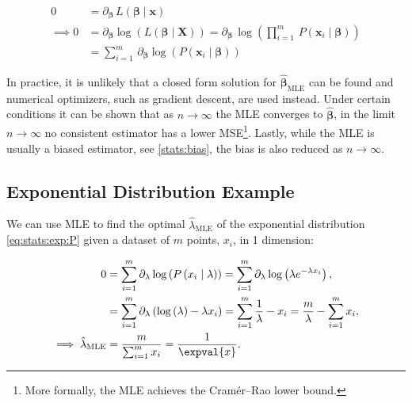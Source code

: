 \begin{subequations}\label{eq:MLE}
\begin{align}
0 &= \partial_{\bm{\beta}} \, L\left(\bm{\beta} \mid \mathbf{x}\right) \label{eq:MLE:L} \\
\implies 0 &= \partial_{\bm{\beta}} \log\left(L\left(\bm{\beta} \mid \mathbf{X}\right)\right) = \partial_{\bm{\beta}} \, \log\left(\prod_{i=1}^{m} \, P\left(\mathbf{x}_{i} \mid \bm{\beta}\right)\right) \label{eq:MLE:log_L} \\
&= \sum_{i=1}^{m} \, \partial_{\bm{\beta}} \log\left(P\left(\mathbf{x}_{i} \mid \bm{\beta}\right)\right) \label{eq:MLE:log_L_sum}
\end{align}
\end{subequations}

In practice, it is unlikely that a closed form solution for $\hat{\bm{\beta}}_{\text{MLE}}$ can be found
and numerical optimizers, such as gradient descent, are used instead.
Under certain conditions it can be shown that as $n \to \infty$ the MLE converges to $\hat{\bm{\beta}}$,
\ie in the limit $n \to \infty$ no consistent estimator
has a lower MSE\footnote{More formally, the MLE achieves the Cram\'er--Rao lower bound.}.
Lastly, while the MLE is usually a biased estimator, see \cref{stats:bias},
the bias is also reduced as $n \to \infty$.

\subsection{Exponential Distribution Example}
\label{opt:MLE:exp_ex}

We can use MLE to find the optimal $\hat{\lambda}_{\text{MLE}}$ of
the exponential distribution \cref{eq:stats:exp:P}
given a dataset of $m$ points, $x_{i}$, in 1 dimension:

\begin{subequations}\label{eq:MLE:exp_ex}
\begin{align}
0 &= \sum_{i=1}^{m} \partial_{\lambda} \log\left(P\left(x_{i} \mid \lambda\right)\right) = \sum_{i=1}^{m} \partial_{\lambda} \log\left(\lambda e^{-\lambda x_{i}}\right), \label{eq:MLE:exp_ex:log_L_sum} \\
&= \sum_{i=1}^{m}\partial_{\lambda} \left( \log\left(\lambda\right) -\lambda x_{i}\right) = \sum_{i=1}^{m} \frac{1}{\lambda} - x_{i} = \frac{m}{\lambda} - \sum_{i=1}^{m} x_{i}, \label{eq:MLE:exp_ex:solve} \\
\implies \hat{\lambda}_{\text{MLE}} &= \frac{m}{\sum_{i=1}^{m} x_{i}} = \frac{1}{\expval{x}}. \label{eq:MLE:exp_ex:lambda}
\end{align}
\end{subequations}

